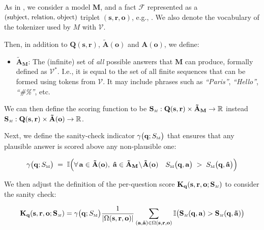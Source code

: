 \begin{definition}
\label{def:knowledge_degree_extended}

As in , we consider a model $\mathbf{M}$,
and a fact \( \mathcal{F} \) represented as a \(\mathbf{ \text{\small (subject, relation, object)}}\) triplet \(\mathbf{(s,r,o)}\), e.g., \emph{}.
We also denote the vocabulary of the tokenizer used by $M$ with $\mathcal{V}$.



Then, in addition to $\mathbf{Q(s,r)}$, $\mathbf{\tilde{A}(o)}$ and $\mathbf{A(o)}$, we define:


\begin{itemize}
    \item $\mathbf{\tilde{A}_M}$: The (infinite) set of \textit{all} possible answers that $\mathbf{M}$ can produce, formally defined as $\mathcal{V}^*$. I.e., it is equal to the set of all finite sequences that can be formed using tokens from $\mathcal{V}$. It may include phrases such as \textit{``Paris''}, \textit{``Hello''}, \textit{``\#\%''}, etc.      
\end{itemize}


We can then define the scoring function to be \( \mathbf{S_{\text{\tiny \emph{M}}}} : \mathbf{Q(s,r)} \times \mathbf{\tilde{A}_M} \to \mathbb{R} \) instead \( \mathbf{S_{\text{\tiny \emph{M}}}} : \mathbf{Q(s,r)} \times \mathbf{\tilde{A}(o)} \to \mathbb{R} \).

Next, we define the sanity-check indicator $\gamma\bigl(\mathbf{q}; S_{\text{\tiny M}}\bigr)$ that ensures that any plausible answer is scored above any non-plausible one:

\vspace{-10pt}
\begin{equation*}
\gamma\bigl(\mathbf{q}; S_{\text{\tiny M}}\bigr)
\;=\;
\mathbb{I}\Bigl(
  \forall\,\mathbf{a} \in \mathbf{\tilde{A}(o)},\;
  \mathbf{\hat{a}}\in \mathbf{\tilde{A}_M}\!\setminus\!\mathbf{\tilde{A}(o)}
  \quad
  S_{\text{\tiny M}}\bigl(\mathbf{q},\mathbf{a}\bigr)
  \;>\;
  S_{\text{\tiny M}}\bigl(\mathbf{q},\mathbf{\hat{a}}\bigr)
\Bigr)
\end{equation*}

We then adjust the definition of the per-question score $\mathbf{K}_{\mathbf{q}}(\mathbf{s,r,o}; \mathbf{S_{\text{\tiny \emph{M}}}})$ to consider the sanity check:


\vspace{-8pt}
\begin{equation}
\label{eq:K_q_full}
\mathbf{K}_{\mathbf{q}}(\mathbf{s,r,o}; \mathbf{S_{\text{\tiny \emph{M}}}}) =
\gamma\bigl(\mathbf{q}; S_{\text{\tiny M}}\bigr)
\frac{1}{|\Omega(\mathbf{s,r,o})|}
\sum_{(\mathbf{a}, \tilde{\mathbf{a}}) \in \Omega(\mathbf{s,r,o})}
\mathbb{I} \bigl(
    \mathbf{S_{\text{\tiny \emph{M}}}}(\mathbf{q,a}) > \mathbf{S_{\text{\tiny \emph{M}}}}(\mathbf{q,\tilde{a}})
\bigr)
\end{equation}




\end{definition}



